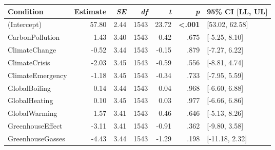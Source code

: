 \begin{table}[ht]
\centering
\begin{tabular}{lrrrrrl}
  \hline
Condition & Estimate & \textit{SE} & \textit{df} & \textit{t} & \textit{p} & 95\% CI [LL, UL] \\ 
  \hline
(Intercept) & 57.80 & 2.44 & 1543 & 23.72 & \textbf{\textless  .001} & [53.02, 62.58] \\ 
  CarbonPollution & 1.43 & 3.40 & 1543 & 0.42 & .675 & [-5.25, 8.10] \\ 
  ClimateChange & -0.52 & 3.44 & 1543 & -0.15 & .879 & [-7.27, 6.22] \\ 
  ClimateCrisis & -2.03 & 3.45 & 1543 & -0.59 & .556 & [-8.81, 4.74] \\ 
  ClimateEmergency & -1.18 & 3.45 & 1543 & -0.34 & .733 & [-7.95, 5.59] \\ 
  GlobalBoiling & 0.14 & 3.44 & 1543 & 0.04 & .968 & [-6.60, 6.88] \\ 
  GlobalHeating & 0.10 & 3.45 & 1543 & 0.03 & .977 & [-6.66, 6.86] \\ 
  GlobalWarming & 1.57 & 3.41 & 1543 & 0.46 & .646 & [-5.13, 8.26] \\ 
  GreenhouseEffect & -3.11 & 3.41 & 1543 & -0.91 & .362 & [-9.80, 3.58] \\ 
  GreenhouseGasses & -4.43 & 3.44 & 1543 & -1.29 & .198 & [-11.18, 2.32] \\ 
   \hline
\end{tabular}
\end{table}
